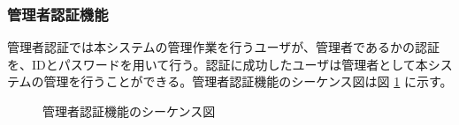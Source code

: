 \documentclass[a4j]{jarticle}
\begin{document}
 \subsubsection{管理者認証機能}
 管理者認証では本システムの管理作業を行うユーザが、管理者であるかの認証を、IDとパスワードを用いて行う。認証に成功したユーザは管理者として本システムの管理を行うことができる。管理者認証機能のシーケンス図は図 \ref{fig:admin_admin-login.png} に示す。
               \begin{figure}[H]
\centering
{}
\caption{管理者認証機能のシーケンス図}
\label{fig:admin_admin-login.png}
\end{figure}
\end{document}

